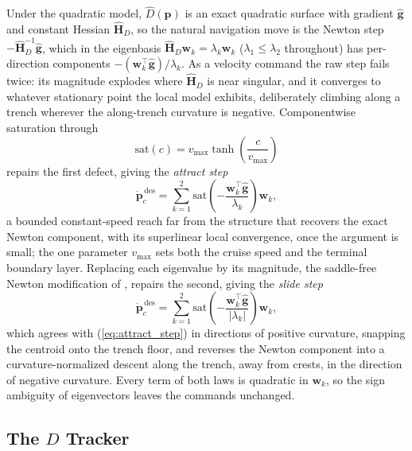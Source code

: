 \documentclass[lettersize,journal]{IEEEtran}
\begin{document}
Under the quadratic model, $\hat{D}(\mathbf{p})$ is an exact quadratic
surface with gradient $\hat{\mathbf{g}}$ and constant Hessian
$\hat{\mathbf{H}}_D$, so the natural navigation move is the Newton step
$-\hat{\mathbf{H}}_D^{-1}\hat{\mathbf{g}}$, which in the eigenbasis
$\hat{\mathbf{H}}_D \mathbf{w}_k = \lambda_k \mathbf{w}_k$ ($\lambda_1
\leq \lambda_2$ throughout) has per-direction components
$-(\mathbf{w}_k^\top \hat{\mathbf{g}})/\lambda_k$. As a velocity
command the raw step fails twice: its magnitude explodes where
$\hat{\mathbf{H}}_D$ is near singular, and it converges to whatever
stationary point the local model exhibits, deliberately climbing along
a trench wherever the along-trench curvature is negative. Componentwise
saturation through
\begin{equation}
    \mathrm{sat}(c) = v_{\max} \tanh\!\left(\frac{c}{v_{\max}}\right)
    \label{eq:sat}
\end{equation}
repairs the first defect, giving the \emph{attract step}
\begin{equation}
    \dot{\mathbf{p}}_c^{\,\text{des}} = \sum_{k=1}^{2}
    \mathrm{sat}\!\left(-\frac{\mathbf{w}_k^\top
    \hat{\mathbf{g}}}{\lambda_k}\right)\mathbf{w}_k,
    \label{eq:attract_step}
\end{equation}
a bounded constant-speed reach far from the structure that recovers the
exact Newton component, with its superlinear local convergence, once
the argument is small; the one parameter $v_{\max}$ sets both the
cruise speed and the terminal boundary layer. Replacing each eigenvalue
by its magnitude, the saddle-free Newton modification of \cite{35},
repairs the second, giving the \emph{slide step}
\begin{equation}
    \dot{\mathbf{p}}_c^{\,\text{des}} = \sum_{k=1}^{2}
    \mathrm{sat}\!\left(-\frac{\mathbf{w}_k^\top
    \hat{\mathbf{g}}}{|\lambda_k|}\right)\mathbf{w}_k,
    \label{eq:slide_step}
\end{equation}
which agrees with (\ref{eq:attract_step}) in directions of positive
curvature, snapping the centroid onto the trench floor, and reverses
the Newton component into a curvature-normalized descent along the
trench, away from crests, in the direction of negative curvature. Every
term of both laws is quadratic in $\mathbf{w}_k$, so the sign ambiguity
of eigenvectors leaves the commands unchanged.

\subsection{The $D$ Tracker}
\label{sec:sep_controller}
\end{document}
